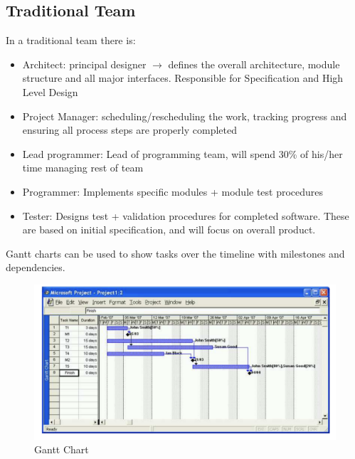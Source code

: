 \documentclass{article}
\begin{document}
\subsection{Traditional Team}
In a traditional team there is:
\begin{itemize}
    \item Architect: principal designer $\rightarrow$ defines the overall architecture, module structure and all major interfaces. Responsible for Specification and High Level Design
    \item Project Manager: scheduling/rescheduling the work, tracking progress and ensuring all process steps are properly completed
    \item Lead programmer: Lead of programming team, will spend 30\% of his/her time managing rest of team
    \item Programmer: Implements specific modules + module test procedures
    \item Tester: Designs test + validation procedures for completed software. These are based on initial specification, and will focus on overall product.
\end{itemize}
Gantt charts can be used to show tasks over the timeline with milestones and dependencies.
\begin{figure}[H]
    \centering
\includegraphics[width=0.8\linewidth]{Pictures/Screenshot 2023-02-08 at 12.17.55.png}
\caption{Gantt Chart}
\end{figure}
\end{document}
